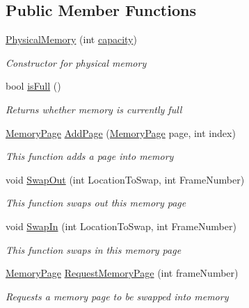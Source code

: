 \subsection*{Public Member Functions}
\begin{DoxyCompactItemize}
\item 
\hyperlink{class_c_p_u___o_s___simulator_1_1_memory_1_1_physical_memory_ab870660d7d17f3e34b71c75ee89d9935}{Physical\+Memory} (int \hyperlink{class_c_p_u___o_s___simulator_1_1_memory_1_1_physical_memory_aefbb5641a06c37aa17bb523d8c90dc60}{capacity})
\begin{DoxyCompactList}\small\item\em Constructor for physical memory \end{DoxyCompactList}\item 
bool \hyperlink{class_c_p_u___o_s___simulator_1_1_memory_1_1_physical_memory_a10cd5c3c1c36f246acfbe96fecbf81cc}{is\+Full} ()
\begin{DoxyCompactList}\small\item\em Returns whether memory is currently full \end{DoxyCompactList}\item 
\hyperlink{class_c_p_u___o_s___simulator_1_1_memory_1_1_memory_page}{Memory\+Page} \hyperlink{class_c_p_u___o_s___simulator_1_1_memory_1_1_physical_memory_aae1eddd302bb1494c2501e8127ff02bc}{Add\+Page} (\hyperlink{class_c_p_u___o_s___simulator_1_1_memory_1_1_memory_page}{Memory\+Page} page, int index)
\begin{DoxyCompactList}\small\item\em This function adds a page into memory \end{DoxyCompactList}\item 
void \hyperlink{class_c_p_u___o_s___simulator_1_1_memory_1_1_physical_memory_a60918e50d8bc9e1a07ac640153343f69}{Swap\+Out} (int Location\+To\+Swap, int Frame\+Number)
\begin{DoxyCompactList}\small\item\em This function swaps out this memory page \end{DoxyCompactList}\item 
void \hyperlink{class_c_p_u___o_s___simulator_1_1_memory_1_1_physical_memory_ac12efe05d774b7e2ea38142835e0c131}{Swap\+In} (int Location\+To\+Swap, int Frame\+Number)
\begin{DoxyCompactList}\small\item\em This function swaps in this memory page \end{DoxyCompactList}\item 
\hyperlink{class_c_p_u___o_s___simulator_1_1_memory_1_1_memory_page}{Memory\+Page} \hyperlink{class_c_p_u___o_s___simulator_1_1_memory_1_1_physical_memory_a525c8a54ebd978b870884dc30f5800ff}{Request\+Memory\+Page} (int frame\+Number)
\begin{DoxyCompactList}\small\item\em Requests a memory page to be swapped into memory \end{DoxyCompactList}\end{DoxyCompactItemize}
